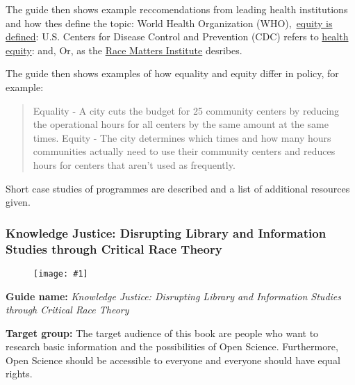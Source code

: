 \documentclass{article}
\newlength{\imgwidth}
\newcommand\scaledgraphics[2]{%
                
\settowidth{\imgwidth}{\texttt{[image: \#1]}}%
                
\setlength{\imgwidth}{\minof{\imgwidth}{#2\textwidth}}%
                
\texttt{[image: \#1]}%
                
}
\begin{document}
The guide then shows example reccomendations from leading health institutions and how thes define the topic: World Health Organization (WHO), \href{https://www.who.int/healthsystems/topics/equity/en/}{equity is defined}:  U.S. Centers for Disease Control and Prevention (CDC) refers to \href{https://www.cdc.gov/minorityhealth/strategies2016/index.html}{health equity}: and, Or, as the \href{http://viablefuturescenter.org/racemattersinstitute/}{Race Matters Institute} desribes.


The guide then shows examples of how equality and equity differ in policy, for example: 

\begin{quote}



Equality - A city cuts the budget for 25 community centers by reducing the operational hours for all centers by the same amount at the same times. Equity - The city determines which times and how many hours communities actually need to use their community centers and reduces hours for centers that aren’t used as frequently.


\end{quote}


Short case studies of programmes are described and a list of additional resources given.


\subsubsection{Knowledge Justice: Disrupting Library and Information Studies through Critical Race Theory}\label{H8244312}



\begin{center}
\begin{figure}
\scaledgraphics{dcc1d35b-4186-4b50-a5a6-cf54422a8064.jpeg}{0.75}
\label{F29320001}
\end{figure}


\end{center}


\textbf{Guide name:} \emph{Knowledge Justice: Disrupting Library and Information Studies through Critical Race Theory} \autocite{leung_knowledge_2021}


\textbf{Target group: }The target audience of this book are people who want to research basic information and the possibilities of Open Science. Furthermore, Open Science should be accessible to everyone and everyone should have equal rights.
\end{document}

